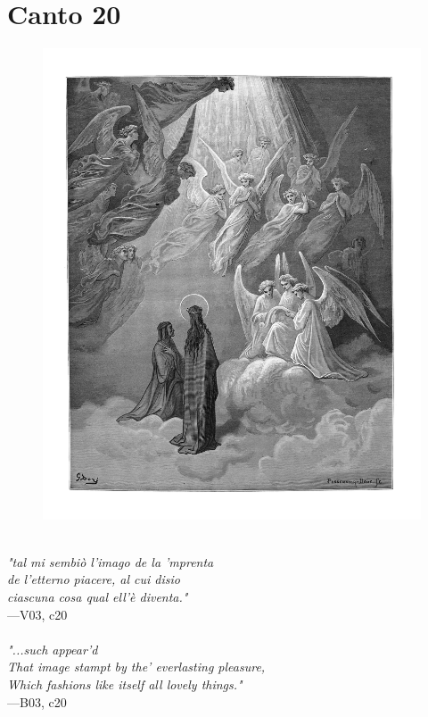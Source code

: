 \documentclass[../Dore_vision.tex]{subfiles}
\begin{document}
\newpage

\section{Canto 20}

\begin{figure}[ht]
\centering
\includegraphics[height=\figsize]{illustrations/book_3/V03, c20.jpg}
\end{figure}

\begin{center}
\begin{minipage}{0.8\linewidth}
\textit{\\
"tal mi sembi\`o l’imago de la ’mprenta\\de l’etterno piacere, al cui disio\\ciascuna cosa qual ell’è diventa."} \\
—V03, c20 \\~\\
\textit{"...such appear'd\\That image stampt by the' everlasting pleasure,\\Which fashions like itself all lovely things."} \\
—B03, c20
\end{minipage}
\end{center}
\end{document}
